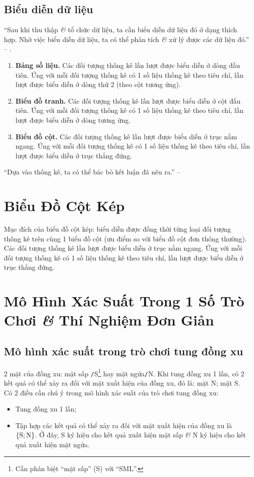 \documentclass[oneside]{book}
\numberwithin{equation}{section}
\begin{document}
\subsection{Biểu diễn dữ liệu}
``Sau khi thu thập \textit{\&} tổ chức dữ liệu, ta cần biểu diễn dữ liệu đó ở dạng thích hợp. Nhờ việc biểu diễn dữ liệu, ta có thể phân tích \textit{\&} xử lý được các dữ liệu đó.'' -- \cite[p. 6]{Thai_Anh_Dat_Ha_Loan_Nam_Quang_Toan_6_tap_2}.
\begin{enumerate}
	\item \textbf{Bảng số liệu.} Các đối tượng thống kê lần lượt được biểu diễn ở dòng đầu tiên. Ứng với mỗi đối tượng thống kê có 1 số liệu thống kê theo tiêu chí, lần lượt được biểu diễn ở dòng thứ 2 (theo cột tương ứng).
	\item \textbf{Biểu đồ tranh.} Các đối tượng thống kê lần lượt được biểu diễn ở cột đầu tiên. Ứng với mỗi đối tượng thống kê có 1 số liệu thống kê theo tiêu chí, lần lượt được biểu diễn ở dòng tương ứng.
	\item \textbf{Biểu đồ cột.} Các đối tượng thống kê lần lượt được biểu diễn ở trục nằm ngang. Ứng với mỗi đối tượng thống kê có 1 số liệu thống kê theo tiêu chí, lần lượt được biểu diễn ở trục thẳng đứng.
\end{enumerate}
``Dựa vào thống kê, ta có thể bác bỏ kết luận đã nêu ra.'' -- \cite[p. 8]{Thai_Anh_Dat_Ha_Loan_Nam_Quang_Toan_6_tap_2}

\section{Biểu Đồ Cột Kép}
Mục đích của biểu đồ cột kép: biểu diễn được đồng thời từng loại đối tượng thống kê trên cùng 1 biểu đồ cột (ưu điểm so với biểu đồ cột đơn thông thường). Các đối tượng thống kê lần lượt được biểu diễn ở trục nằm ngang. Ứng với mỗi đối tượng thống kê có 1 số liệu thống kê theo tiêu chí, lần lượt được biểu diễn ở trục thẳng đứng.

\section{Mô Hình Xác Suất Trong 1 Số Trò Chơi \textit{\&} Thí Nghiệm Đơn Giản}

\subsection{Mô hình xác suất trong trò chơi tung đồng xu}
2 mặt của đồng xu: mặt sấp \texttt{/}S\footnote{Cần phân biệt ``mặt sấp'' (S) với ``SML''.} hay mặt ngửa\texttt{/}N. Khi tung đồng xu 1 lần, có 2 kết quả có thể xảy ra đối với mặt xuất hiện của đồng xu, đó là: mặt N; mặt S. Có 2 điều cần chú ý trong mô hình xác suất của trò chơi tung đồng xu:
\begin{itemize}
	\item Tung đồng xu 1 lần;
	\item Tập hợp các kết quả có thể xảy ra đối với mặt xuất hiện của đồng xu là $\{\rm S;N\}$. Ở đây, S ký hiệu cho kết quả xuất hiện mặt sấp \textit{\&} N ký hiệu cho kết quả xuất hiện mặt ngửa.
\end{itemize}
\end{document}
